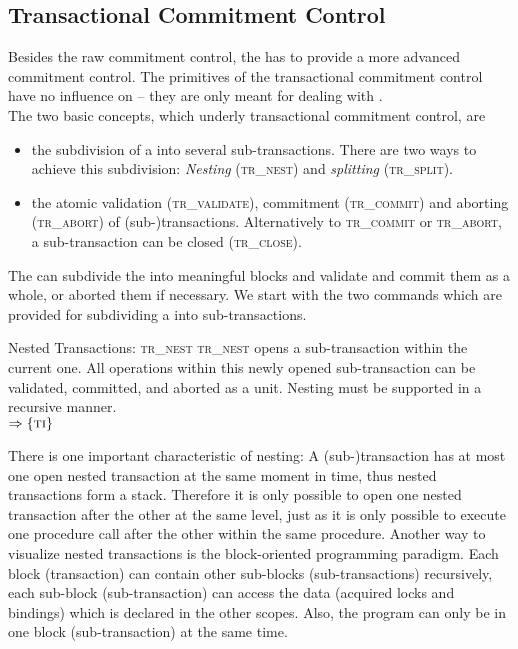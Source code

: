 \documentclass[a4paper, 12pt]{book}
\newcommand{\INTERFACE}[1]{$\Rightarrow\left\{#1\right\}$}
\begin{document}
\subsection{Transactional Commitment Control}

\newcommand{\dbaiTRNEST}{{\normalfont\textsc{tr\_nest}}\xspace}
\newcommand{\dbaiTRSPLIT}{{\normalfont\textsc{tr\_split}}\xspace}
\newcommand{\dbaiTRVALIDATE}{{\normalfont\textsc{tr\_validate}}\xspace}
\newcommand{\dbaiTRCOMMIT}{{\normalfont\textsc{tr\_commit}}\xspace}
\newcommand{\dbaiTRABORT}{{\normalfont\textsc{tr\_abort}}\xspace}
\newcommand{\dbaiTRCLOSE}{{\normalfont\textsc{tr\_close}}\xspace}


Besides the raw commitment control, the \SYNEIGHT has to provide a more
advanced commitment control. The primitives of the transactional commitment
control have no influence on  -- they are only meant for dealing
with .\\
The two basic concepts, which underly transactional commitment control, are
\begin{itemize}
\item the subdivision of a  into several sub-transactions.
  There are two ways to achieve this subdivision: \emph{Nesting} (\dbaiTRNEST)
  and \emph{splitting} (\dbaiTRSPLIT).
\item the atomic validation (\dbaiTRVALIDATE), commitment (\dbaiTRCOMMIT) and
  aborting (\dbaiTRABORT) of (sub-)transactions. Alternatively to
  \dbaiTRCOMMIT or \dbaiTRABORT, a sub-transaction can be closed (\dbaiTRCLOSE).
\end{itemize}
%
The  can subdivide the  into meaningful blocks and
validate and commit them as a whole, or aborted them if necessary.
%
We start with the two commands which are provided for subdividing a
 into sub-transactions.

\begin{requirement*}{Nested Transactions: \dbaiTRNEST}
  \dbaiTRNEST opens a sub-transaction within the current one. All operations
  within this newly opened sub-transaction can be validated, committed,
  and aborted as a unit. Nesting must be supported in a recursive manner.\\
  \INTERFACE{\TRANSACTION}
\end{requirement*}
%
There is one important characteristic of nesting: A (sub-)transaction
has at most one open nested transaction at the same moment in time,
thus nested transactions form a stack. Therefore it is only possible to open one
nested transaction after the other at the same level, just as it is
only possible to execute one procedure call after the other within the
same procedure.
%
Another way to visualize nested transactions is the block-oriented programming
paradigm. Each block (transaction) can contain other sub-blocks
(sub-transactions) recursively, each sub-block (sub-transaction) can
access the data (acquired locks and bindings) which is declared in the other
scopes. Also, the program can only be in one block (sub-transaction) at the
same time.
\end{document}

